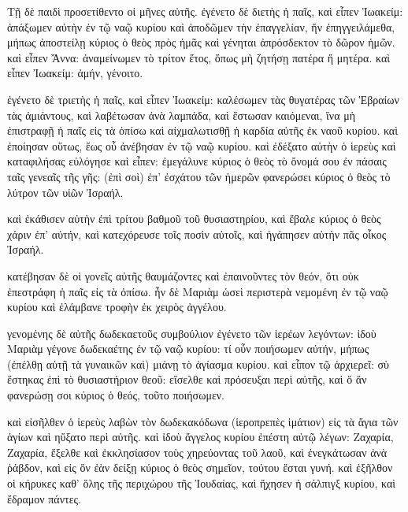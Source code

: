 \pend\pstart
{}

\pend\pstart
Τῇ δὲ παιδὶ προσετίθεντο οἱ μῆνες αὐτῆς. ἐγένετο δὲ διετὴς ἡ παῖς, καὶ εἶπεν Ἰωακείμ: ἀπάξωμεν αὐτὴν ἐν τῷ ναῷ κυρίου καὶ ἀποδῶμεν τὴν ἐπαγγελίαν, ἥν ἐπηγγειλάμεθα, μήπως ἀποστείλῃ κύριος ὁ θεὸς πρὸς ἡμᾶς καὶ γένηται ἀπρόσδεκτον τὸ δῶρον ἡμῶν. καὶ εἶπεν Ἄννα: ἀναμείνωμεν τὸ τρίτον ἔτος, ὅπως μὴ ζητήσῃ πατέρα ἤ μητέρα. καὶ εἶπεν Ἰωακείμ: ἀμήν, γένοιτο.

\pend\pstart
ἐγένετο δὲ τριετὴς ἡ παῖς, καὶ εἶπεν Ἰωακείμ: καλέσωμεν τὰς θυγατέρας τῶν Ἑβραίων τὰς ἀμιάντους, καὶ λαβέτωσαν ἀνὰ λαμπάδα, καὶ ἔστωσαν καιόμεναι, ἵνα μὴ ἐπιστραφῇ ἡ παῖς εἰς τὰ ὀπίσω καὶ αἰχμαλωτισθῇ ἡ καρδία αὐτῆς ἐκ ναοῦ κυρίου. καὶ ἐποίησαν οὕτως, ἕως οὗ ἀνέβησαν ἐν τῷ ναῷ κυρίου. καὶ ἐδέξατο αὐτὴν ὁ ἱερεὺς καὶ καταφιλήσας εὐλόγησε καὶ εἶπεν: ἐμεγάλυνε κύριος ὁ θεὸς τὸ ὄνομά σου ἐν πάσαις ταῖς γενεαῖς τῆς γῆς: (ἐπὶ σοὶ) ἐπ' ἐσχάτου τῶν ἡμερῶν φανερώσει κύριος ὁ θεὸς τὸ λύτρον τῶν υἱῶν Ἰσραήλ.

\pend\pstart
καὶ ἐκάθισεν αὐτὴν ἐπὶ τρίτου βαθμοῦ τοῦ θυσιαστηρίου, καὶ ἔβαλε κύριος ὁ θεὸς χάριν ἐπ' αὐτήν, καὶ κατεχόρευσε τοῖς ποσὶν αὐτοῖς, καὶ ἠγάπησεν αὐτὴν πᾶς οἶκος Ἰσραήλ.

\pend\pstart
{}

\pend\pstart
κατέβησαν δὲ οἱ γονεῖς αὐτῆς θαυμάζοντες καὶ ἐπαινοῦντες τὸν θεόν, ὅτι οὐκ ἐπεστράφη ἡ παῖς εἰς τὰ ὀπίσω. ἦν δὲ Μαριὰμ ὡσεὶ περιστερὰ νεμομένη ἐν τῷ ναῷ κυρίου καὶ ἐλάμβανε τροφὴν ἐκ χειρὸς ἀγγέλου.

\pend\pstart
γενομένης δὲ αὐτῆς δωδεκαετοῦς συμβούλιον ἐγένετο τῶν ἱερέων λεγόντων: ἰδοὺ Μαριὰμ γέγονε δωδεκαέτης ἐν τῷ ναῷ κυρίου: τί οὖν ποιήσωμεν αὐτήν, μήπως (ἐπέλθῃ αὐτῇ τὰ γυναικῶν καὶ) μιάνῃ τὸ ἁγίασμα κυρίου. καὶ εἶπον τῷ ἀρχιερεῖ: σὺ ἕστηκας ἐπὶ τὸ θυσιαστήριον θεοῦ: εἴσελθε καὶ πρόσευξαι περὶ αὐτῆς, καὶ ὅ ἄν φανερώσῃ σοι κύριος ὁ θεός, τοῦτο ποιήσωμεν.

\pend\pstart
καὶ εἰσῆλθεν ὁ ἱερεὺς λαβὼν τὸν δωδεκα\-κόδωνα (ἱεροπρεπὲς ἱμάτιον) εἰς τὰ ἅγια τῶν ἁγίων καὶ ηὔξατο περὶ αὐτῆς. καὶ ἰδοὺ ἄγγελος κυρίου ἐπέστη αὐτῷ λέγων: Ζαχαρία, Ζαχαρία, ἔξελθε καὶ ἐκκλησίασον τοὺς χηρεύοντας τοῦ λαοῦ, καὶ ἐνεγκάτωσαν ἀνὰ ῥάβδον, καὶ εἰς ὅν ἐὰν δείξῃ κύριος ὁ θεὸς σημεῖον, τούτου ἔσται γυνή. καὶ ἐξῆλθον οἱ κήρυκες καθ' ὅλης τῆς περιχώρου τῆς Ἰουδαίας, καὶ ἤχησεν ἡ σάλπιγξ κυρίου, καὶ ἔδραμον πάντες.

\pend\pstart
{}

\pend
